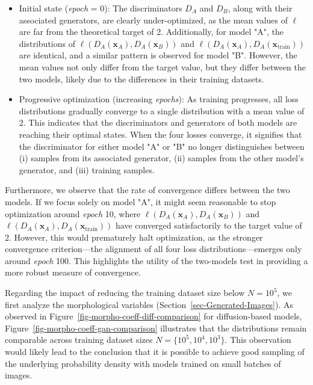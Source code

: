\documentclass[fleqn,usenatbib]{mnras}
\begin{document}
\begin{itemize}
    \item {Initial state (\textit{epoch} = 0)}: The discriminators \(D_A\) and \(D_B\), along with their associated generators, are clearly under-optimized, as the mean values of \(\ell\) are far from the theoretical target of 2. Additionally, for model "A", the distributions of \(\ell(D_A(\bm{x}_A), D_A(\bm{x}_B))\) and \(\ell(D_A(\bm{x}_A), D_A(\bm{x}_{\text{train}}))\) are identical, and a similar pattern is observed for model "B". However, the mean values not only differ from the target value, but they differ between the two models, likely due to the differences in their training datasets.
    \item {Progressive optimization (increasing \textit{epochs})}: As training progresses, all loss distributions gradually converge to a single distribution with a mean value of 2. This indicates that the discriminators and generators of both models are reaching their optimal states.
    When the four losses converge, it signifies that the discriminator for either model "A" or "B" no longer distinguishes between (i) samples from its associated generator, (ii) samples from the other model's generator, and (iii) training samples. 
\end{itemize}


Furthermore, we observe that the rate of convergence differs between the two models. If we focus solely on model "A", it might seem reasonable to stop optimization around \textit{epoch} 10, where \(\ell(D_A(\bm{x}_A), D_A(\bm{x}_B))\) and \(\ell(D_A(\bm{x}_A), D_A(\bm{x}_{\text{train}}))\) have converged satisfactorily to the target value of 2. However, this would prematurely halt optimization, as the stronger convergence criterion—the alignment of all four loss distributions—emerges only around \textit{epoch} 100. This highlights the utility of the two-models test in providing a more robust measure of convergence.


Regarding the impact of reducing the training dataset size below $N=10^5$, we first analyze the morphological variables (Section~\ref{sec-Generated-Images}). As observed in Figure~\ref{fig-morpho-coeff-diff-comparison} for diffusion-based models, Figure~\ref{fig-morpho-coeff-gan-comparison} illustrates that the distributions remain comparable across training dataset sizes $N=\{10^5, 10^4, 10^3\}$. This observation would likely lead to the conclusion that it is possible to achieve good sampling of the underlying probability density with models trained on small batches of images.
\end{document}
